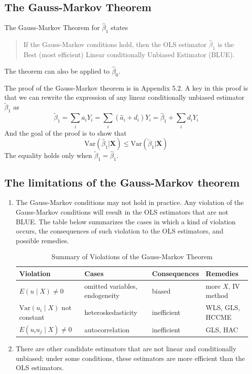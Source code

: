 \documentclass[a4paper,11pt]{article}
\newcommand{\var}{\mathrm{Var}}
\begin{document}
\subsection{The Gauss-Markov Theorem}
\label{sec:org7b53d6c}

The Gauss-Markov Theorem for \(\hat{\beta}_1\) states
\label{orgcff966e}
\begin{quote}
If the Gauss-Markov conditions hold, then the OLS estimator
\(\hat{\beta}_1\) is the Best (most efficient) Linear conditionally
Unbiased Estimator (BLUE).
\end{quote}

The theorem can also be applied to \(\hat{\beta}_0\).

The proof of the Gauss-Markov theorem is in Appendix 5.2. A key in
this proof is that we can rewrite the expression of any linear
conditionally unbiased estimator \(\tilde{\beta}_1\) as
\[ \tilde{\beta}_1 = \sum_i a_i Y_i = \sum_i (\hat{a}_i + d_i)Y_i =
\hat{\beta}_1 + \sum_i d_i Y_i \]
And the goal of
the proof is to show that
\[ \var(\hat{\beta}_1 | \mathbf{X}) \leq \var(\tilde{\beta}_1 |
\mathbf{X}) \]
The equality holds only when \(\tilde{\beta}_1 = \hat{\beta}_1\). 


\subsection{The limitations of the Gauss-Markov theorem}
\label{sec:org5e108ce}

\begin{enumerate}
\item The Gauss-Markov conditions may not hold in practice. Any violation
of the Gauss-Markov conditions will result in the OLS estimators
that are not BLUE. The table below summarizes the cases in which a
kind of violation occurs, the consequences of such violation to the
OLS estimators, and possible remedies.

\begin{table}[htbp]
\caption{Summary of Violations of the Gauss-Markov Theorem}
\centering
\small
\begin{tabular}{p{4cm}|p{5.5cm}|p{2.5cm}|p{3.4cm}}
\toprule
Violation & Cases & Consequences & Remedies\\
\midrule
\(E(u \mid X) \neq 0\) & omitted variables, endogeneity & biased & more \(X\), IV method\\
\(\var(u_i\mid X)\) not constant & heteroskedasticity & inefficient & WLS, GLS, HCCME\\
\(E(u_{i}u_{j}\mid X) \neq 0\) & autocorrelation & inefficient & GLS, HAC\\
\bottomrule
\end{tabular}
\end{table}

\item There are other candidate estimators that are not linear and
conditionally unbiased; under some conditions, these estimators are
more efficient than the OLS estimators.
\end{enumerate}
\end{document}
